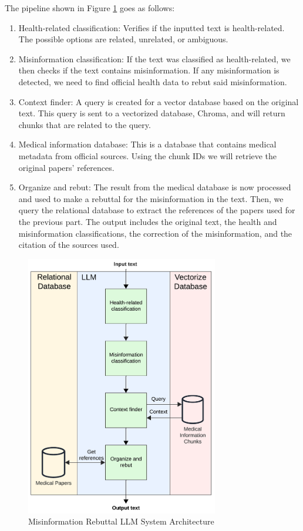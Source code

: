 The pipeline shown in Figure \ref{fig:llm} goes as follows:

\begin{enumerate}
	\item Health-related classification: Verifies if the inputted text is health-related. The possible options are related, unrelated, or ambiguous.
	\item Misinformation classification: If the text was classified as health-related, we then checks if the text contains misinformation. If any misinformation is detected, we need to find official health data to rebut said misinformation.
	\item	Context finder: A query is created for a vector database based on the original text. This query is sent to a vectorized database, Chroma, and will return chunks that are related to the query.
	\item	Medical information database:  This is a database that contains medical metadata from official sources. Using the chunk IDs we will retrieve the original papers' references.
	\item	Organize and rebut: The result from the medical database is now processed and used to make a rebuttal for the misinformation in the text. Then, we query the relational database to extract the references of the papers used for the previous part.
	The output includes the original text, the health and misinformation classifications, the correction of the misinformation, and the citation of the sources used. 
\end{enumerate}

\begin{figure}[H]
	\begin{center}
		\includegraphics[width=0.75\textwidth]{images/LLM_Pipeline} %
	\end{center}
	\caption{Misinformation Rebuttal LLM System Architecture} %
	\label{fig:llm}
\end{figure}

